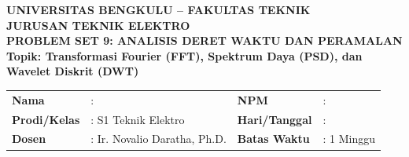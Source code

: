\documentclass[11pt,a4paper]{article}
\begin{document}
\begin{center}
    {\large \textbf{\color{primaryblue}UNIVERSITAS BENGKULU -- FAKULTAS TEKNIK}}\\[0.1cm]
    {\large \textbf{\color{secondaryblue}JURUSAN TEKNIK ELEKTRO}}\\[0.2cm]
    {\LARGE \textbf{\color{primaryblue}PROBLEM SET 9: ANALISIS DERET WAKTU DAN PERAMALAN}}\\[0.1cm]
    {\normalsize \textbf{Topik: Transformasi Fourier (FFT), Spektrum Daya (PSD), dan Wavelet Diskrit (DWT)}}
\end{center}

\vspace{0.1cm}

\begin{tcolorbox}[colback=boxbg,colframe=primaryblue,arc=2mm,title=\textbf{Informasi Tugas \& Identitas Mahasiswa}]
\small
\begin{tabular}{p{2.2cm}p{5.5cm}p{2.2cm}p{5.0cm}}
\textbf{Nama} & : \dotfill & \textbf{NPM} & : \dotfill \\
\textbf{Prodi/Kelas} & : S1 Teknik Elektro & \textbf{Hari/Tanggal} & : \dotfill \\
\textbf{Dosen} & : Ir. Novalio Daratha, Ph.D. & \textbf{Batas Waktu} & : 1 Minggu \\
\end{tabular}
\end{tcolorbox}

\vspace{0.2cm}
\end{document}
